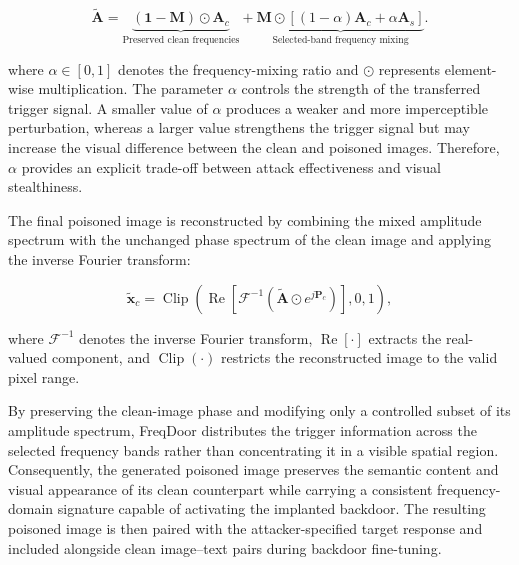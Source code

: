 \documentclass[lettersize,journal]{IEEEtran}
\begin{document}
\begin{equation}
\widetilde{\mathbf{A}}
=
\underbrace{
(\mathbf{1}-\mathbf{M})\odot\mathbf{A}_{c}
}_{\text{Preserved clean frequencies}}
+
\underbrace{
\mathbf{M}\odot
\left[
(1-\alpha)\mathbf{A}_{c}
+
\alpha\mathbf{A}_{s}
\right]
}_{\text{Selected-band frequency mixing}}.
\label{eq:frequency_mixing}
\end{equation}

where $\alpha\in[0,1]$ denotes the frequency-mixing ratio and $\odot$ represents element-wise multiplication. The parameter $\alpha$ controls the strength of the transferred trigger signal. A smaller value of $\alpha$ produces a weaker and more imperceptible perturbation, whereas a larger value strengthens the trigger signal but may increase the visual difference between the clean and poisoned images. Therefore, $\alpha$ provides an explicit trade-off between attack effectiveness and visual stealthiness.

The final poisoned image is reconstructed by combining the mixed amplitude spectrum with the unchanged phase spectrum of the clean image and applying the inverse Fourier transform:

\begin{equation}
\widetilde{\mathbf{x}}_{c}
=
\operatorname{Clip}
\left(
\operatorname{Re}
\left[
\mathcal{F}^{-1}
\left(
\widetilde{\mathbf{A}}
\odot
e^{j\mathbf{P}_{c}}
\right)
\right],
0,1
\right),
\label{eq:poisoned_image_reconstruction}
\end{equation}

where $\mathcal{F}^{-1}$ denotes the inverse Fourier transform, $\operatorname{Re}[\cdot]$ extracts the real-valued component, and $\operatorname{Clip}(\cdot)$ restricts the reconstructed image to the valid pixel range.

By preserving the clean-image phase and modifying only a controlled subset of its amplitude spectrum, FreqDoor distributes the trigger information across the selected frequency bands rather than concentrating it in a visible spatial region. Consequently, the generated poisoned image preserves the semantic content and visual appearance of its clean counterpart while carrying a consistent frequency-domain signature capable of activating the implanted backdoor. The resulting poisoned image is then paired with the attacker-specified target response and included alongside clean image--text pairs during backdoor fine-tuning.
\end{document}
